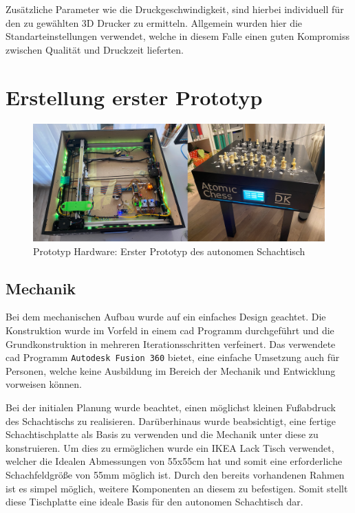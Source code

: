 Zusätzliche Parameter wie die Druckgeschwindigkeit, sind hierbei
individuell für den zu gewählten 3D Drucker zu ermitteln. Allgemein
wurden hier die Standarteinstellungen verwendet, welche in diesem Falle
einen guten Kompromiss zwischen Qualität und Druckzeit lieferten.

\hypertarget{erstellung-erster-prototyp}{%
\chapter{Erstellung erster Prototyp}\label{erstellung-erster-prototyp}}

\begin{figure}
\centering
\includegraphics{images/table_images/dk.png}
\caption{Prototyp Hardware: Erster Prototyp des autonomen Schachtisch
\label{dk}}
\end{figure}

\hypertarget{mechanik}{%
\section{Mechanik}\label{mechanik}}

Bei dem mechanischen Aufbau wurde auf ein einfaches Design geachtet. Die
Konstruktion wurde im Vorfeld in einem \gls{cad} Programm durchgeführt
und die Grundkonstruktion in mehreren Iterationsschritten verfeinert.
Das verwendete \gls{cad} Programm
\passthrough{\lstinline!Autodesk Fusion 360!} bietet, eine einfache
Umsetzung auch für Personen, welche keine Ausbildung im Bereich der
Mechanik und Entwicklung vorweisen können.

Bei der initialen Planung wurde beachtet, einen möglichst kleinen
Fußabdruck des Schachtischs zu realisieren. Darüberhinaus wurde
beabsichtigt, eine fertige Schachtischplatte als Basis zu verwenden und
die Mechanik unter diese zu konstruieren. Um dies zu ermöglichen wurde
ein IKEA Lack Tisch verwendet, welcher die Idealen Abmessungen von
55x55cm hat und somit eine erforderliche Schachfeldgröße von 55mm
möglich ist. Durch den bereits vorhandenen Rahmen ist es simpel möglich,
weitere Komponenten an diesem zu befestigen. Somit stellt diese
Tischplatte eine ideale Basis für den autonomen Schachtisch dar.

